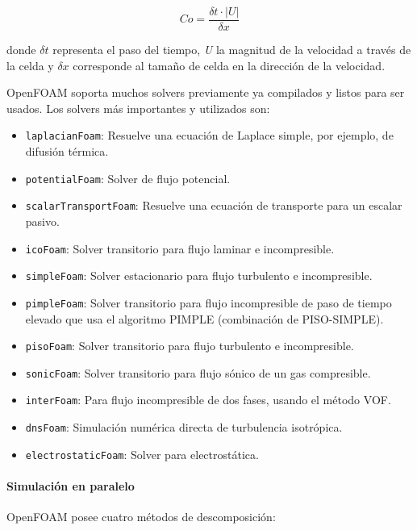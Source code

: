 \[Co=\frac{\delta t ·|U|}{\delta x}\]

donde \(\delta t\) representa el paso del tiempo,
\textbar{}\emph{U}\textbar{} la magnitud de la velocidad a través de la
celda y \(\delta x\) corresponde al tamaño de celda en la dirección de
la velocidad.

OpenFOAM soporta muchos solvers previamente ya compilados y listos para
ser usados. Los solvers más importantes y utilizados son:

\begin{itemize}
\item
  \texttt{laplacianFoam}: Resuelve una ecuación de Laplace simple, por
  ejemplo, de difusión térmica.
\item
  \texttt{potentialFoam}: Solver de flujo potencial.
\item
  \texttt{scalarTransportFoam}: Resuelve una ecuación de transporte para
  un escalar pasivo.
\item
  \texttt{icoFoam}: Solver transitorio para flujo laminar e
  incompresible.
\item
  \texttt{simpleFoam}: Solver estacionario para flujo turbulento e
  incompresible.
\item
  \texttt{pimpleFoam}: Solver transitorio para flujo incompresible de
  paso de tiempo elevado que usa el algoritmo PIMPLE (combinación de
  PISO-SIMPLE).
\item
  \texttt{pisoFoam}: Solver transitorio para flujo turbulento e
  incompresible.
\item
  \texttt{sonicFoam}: Solver transitorio para flujo sónico de un gas
  compresible.
\item
  \texttt{interFoam}: Para flujo incompresible de dos fases, usando el
  método VOF.
\item
  \texttt{dnsFoam}: Simulación numérica directa de turbulencia
  isotrópica.
\item
  \texttt{electrostaticFoam}: Solver para electrostática.
\end{itemize}

\paragraph{Simulación en paralelo}\label{header-n352}

OpenFOAM posee cuatro métodos de descomposición:

